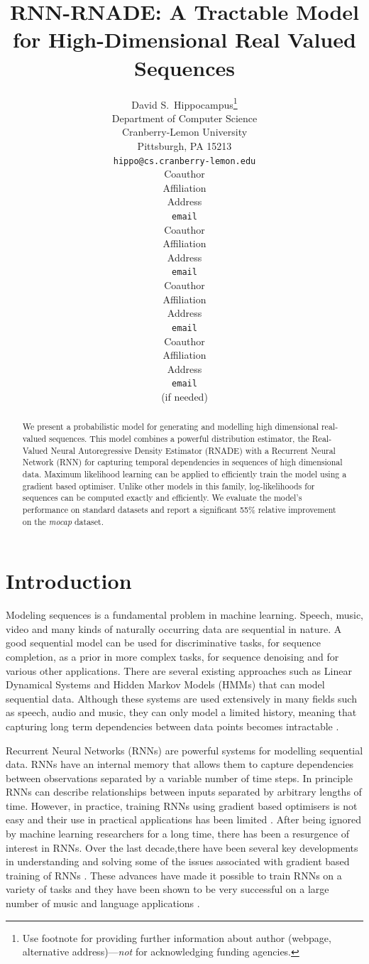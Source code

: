\documentclass{article} %
\title{RNN-RNADE: A Tractable Model for High-Dimensional Real Valued Sequences}
\author{
David S.~Hippocampus\thanks{ Use footnote for providing further information
about author (webpage, alternative address)---\emph{not} for acknowledging
funding agencies.} \\
Department of Computer Science\\
Cranberry-Lemon University\\
Pittsburgh, PA 15213 \\
\texttt{hippo@cs.cranberry-lemon.edu} \\
\And
Coauthor \\
Affiliation \\
Address \\
\texttt{email} \\
\AND
Coauthor \\
Affiliation \\
Address \\
\texttt{email} \\
\And
Coauthor \\
Affiliation \\
Address \\
\texttt{email} \\
\And
Coauthor \\
Affiliation \\
Address \\
\texttt{email} \\
(if needed)\\
}
\begin{document}
\maketitle

\begin{abstract}
We present a probabilistic model for generating and modelling high dimensional real-valued sequences. This model combines a powerful distribution estimator, the Real-Valued Neural Autoregressive Density Estimator (RNADE) with a Recurrent Neural Network (RNN) for capturing temporal dependencies in sequences of high dimensional data. Maximum likelihood learning can be applied to efficiently train the model using a gradient based optimiser. Unlike other models in this family, log-likelihoods for sequences can be computed exactly and efficiently. We evaluate the model's performance on standard datasets and report a significant 55\% relative improvement on the \textit{mocap} dataset. 
\end{abstract}

\section{Introduction}
\label{intro}
Modeling sequences is a fundamental problem in machine learning. Speech, music, video and many kinds of naturally occurring data are sequential in nature. A good sequential model can be used for discriminative tasks, for sequence completion, as a prior in more complex tasks, for sequence denoising and for various other applications. There are several existing approaches such as Linear Dynamical Systems and Hidden Markov Models (HMMs) that can model sequential data. Although these systems are used extensively in many fields such as speech, audio and music, they can only model a limited history, meaning that capturing long term dependencies between data points becomes intractable \cite{sutskever2007learning}. 

Recurrent Neural Networks (RNNs) are powerful systems for modelling sequential data. RNNs have an internal memory that allows them to capture dependencies between observations separated by a variable number of time steps. In principle RNNs can describe relationships between inputs separated by arbitrary lengths of time. However, in practice, training RNNs using gradient based optimisers is not easy and their use in practical applications has been limited \cite{bengio2012advances}. After being ignored by machine learning researchers for a long time, there has been a resurgence of interest in RNNs. Over the last decade,there have been several key developments in understanding and solving some of the issues associated with gradient based training of RNNs \cite{Martens2011,bengio2012advances}. These advances have made it possible to train RNNs on a variety of tasks and they have been shown to be very successful on a large number of music and language applications \cite{mikolov2011empirical,Boulanger-Lewandowski2012,bengio2012advances}. 
\end{document}
